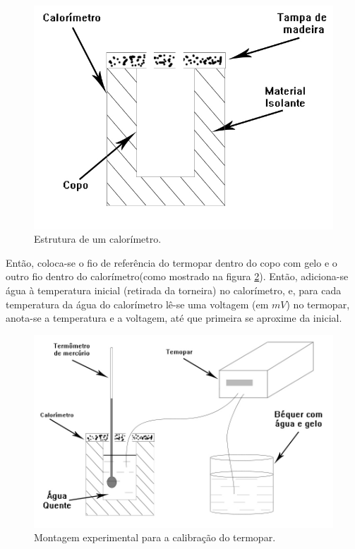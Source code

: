 \documentclass[12pt,a4paper]{article}
\begin{document}
\begin{figure}[!htbp]
\centering
\includegraphics[scale=0.3]{Fig6a1.jpg}
\caption{Estrutura de um calorímetro.}
\label{calorimetro}
\end{figure}

Então, coloca-se o fio de referência do termopar dentro do copo com gelo e o outro fio dentro do calorímetro(como mostrado na figura \ref{exptermopar}). Então, adiciona-se água à temperatura inicial (retirada da torneira) no calorímetro, e, para cada temperatura da água do calorímetro lê-se uma voltagem (em $mV$) no termopar, anota-se a temperatura e a voltagem, até que primeira se aproxime da inicial.

\begin{figure}[!htbp]
\centering
\includegraphics[scale=0.3]{Fig6a2.jpg}
\caption{Montagem experimental para a calibração do termopar.}
\label{exptermopar}
\end{figure}
\end{document}
